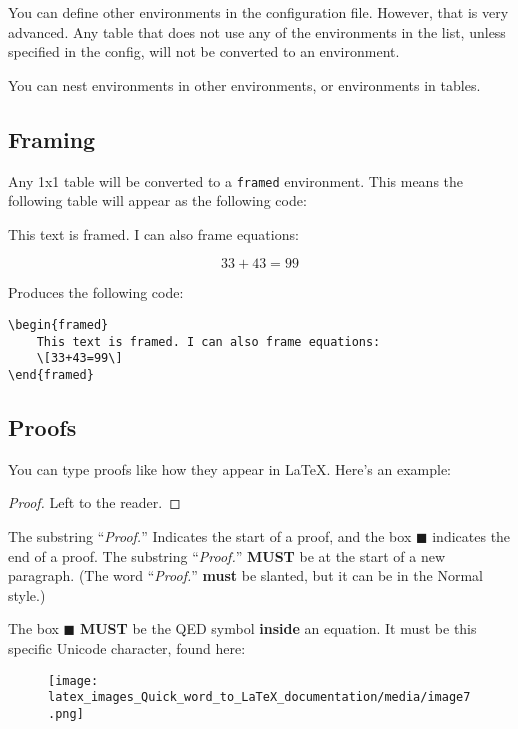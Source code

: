 \documentclass[12pt]{article}
\theoremstyle{plain}
\theoremstyle{remark}
\theoremstyle{definition}
\begin{document}
You can define other environments in the configuration file. However,
that is very advanced. Any table that does not use any of the
environments in the list, unless specified in the config, will not be
converted to an environment.

You can nest environments in other environments, or environments in
tables.


\subsection{Framing}

Any 1x1 table will be converted to a \texttt{framed} environment. This
means the following table will appear as the following code:

\begin{framed}

This text is framed. I can also frame equations:

\[33 + 43 = 99\]

\end{framed}



Produces the following code:

\begin{verbatim}
\begin{framed}
    This text is framed. I can also frame equations:
    \[33+43=99\]
\end{framed}
\end{verbatim}


\subsection{Proofs}

You can type proofs like how they appear in LaTeX. Here's an example:

\begin{proof} Left to the reader. 
\end{proof}

The substring ``\emph{Proof.}'' Indicates the start of a proof, and the
box \(\blacksquare\) indicates the end of a proof. The substring
``\emph{Proof.}'' \textbf{MUST} be at the start of a new paragraph. (The
word ``\emph{Proof.}'' \textbf{must} be slanted, but it can be in the
Normal style.)

The box \(\blacksquare\) \textbf{MUST} be the QED symbol \textbf{inside}
an equation. It must be this specific Unicode character, found here:


\begin{figure}[H]
\centering
\texttt{[image: latex\_images\_Quick\_word\_to\_LaTeX\_documentation/media/image7.png]}
\end{figure}
\end{document}
